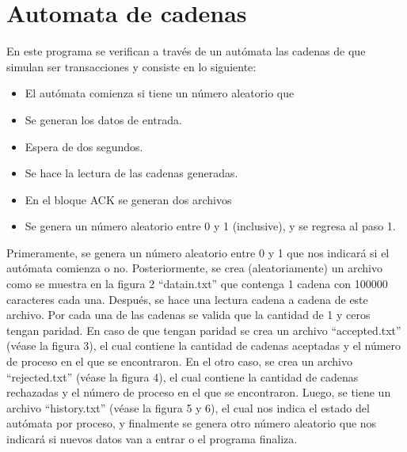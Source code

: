 \documentclass[a4paper]{article}
\begin{document}
		\section{Automata de cadenas}
			En este programa se verifican a través de un autómata las cadenas de que simulan ser transacciones y consiste en lo siguiente: 
			\begin{itemize}
                \item El autómata comienza si tiene un número aleatorio que 
                \item Se generan los datos de entrada.
                \item Espera de dos segundos.
                \item Se hace la lectura de las cadenas generadas.
                \item En el bloque ACK se generan dos archivos 
                \item  Se genera un número aleatorio entre 0 y 1 (inclusive), y se regresa al paso 1. 
            \end{itemize}
            Primeramente, se genera un número aleatorio entre 0 y 1 que nos indicará si el autómata comienza o no.
            Posteriormente, se crea (aleatoriamente) un archivo como se muestra en la figura 2 ``datain.txt''  que contenga 1 cadena con 100000 caracteres cada una.
            Después, se hace una lectura cadena a cadena de este archivo. Por cada una de las cadenas se valida que la cantidad de 1 y ceros tengan paridad. 
            En caso de que tengan paridad se crea un archivo ``accepted.txt'' (véase la figura 3), el cual contiene la cantidad de cadenas aceptadas y el número de proceso en el que se encontraron. 
            En el otro caso, se crea un archivo ``rejected.txt'' (véase la figura 4), el cual contiene la cantidad de cadenas rechazadas y el número de proceso en el que se encontraron. 
            Luego, se tiene un archivo ``history.txt'' (véase la figura 5 y 6), el cual nos indica el estado del autómata por proceso, y finalmente se genera otro número aleatorio que nos indicará si nuevos datos van a entrar o el programa finaliza. 
\end{document}
